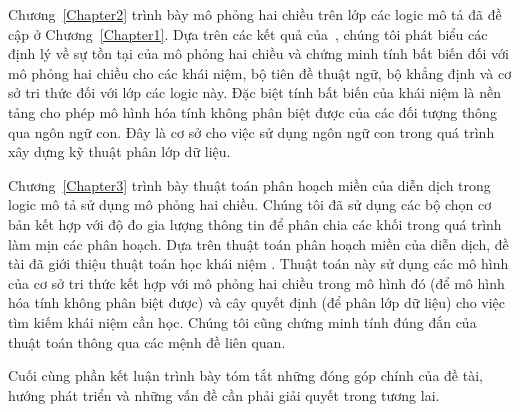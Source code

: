 Chương~\ref{Chapter2} trình bày mô phỏng hai chiều trên lớp các logic mô tả đã đề cập ở Chương~\ref{Chapter1}. Dựa trên các kết quả của~\cite{Divroodi2011B}, chúng tôi phát biểu các định lý về sự tồn tại của mô phỏng hai chiều và chứng minh tính bất biến đối với mô phỏng hai chiều cho các khái niệm, bộ tiên đề thuật ngữ, bộ khẳng định và cơ sở tri thức đối với lớp các logic này. Đặc biệt tính bất biến của khái niệm là nền tảng cho phép mô hình hóa tính không phân biệt được của các đối tượng thông qua ngôn ngữ con. Đây là cơ sở cho việc sử dụng ngôn ngữ con trong quá trình xây dựng kỹ thuật phân lớp dữ liệu.
	
Chương~\ref{Chapter3} trình bày thuật toán phân hoạch miền của diễn dịch trong logic mô tả sử dụng mô phỏng hai chiều. Chúng tôi đã sử dụng các bộ chọn cơ bản kết hợp với độ đo gia lượng thông tin để phân chia các khối trong quá trình làm mịn các phân hoạch. Dựa trên thuật toán phân hoạch miền của diễn dịch, đề tài đã giới thiệu thuật toán học khái niệm \BBCLearnS. Thuật toán này sử dụng các mô hình của cơ sở tri thức kết hợp với mô phỏng hai chiều trong mô hình đó (để mô hình hóa tính không phân biệt được) và cây quyết định (để phân lớp dữ liệu) cho việc tìm kiếm khái niệm cần học. Chúng tôi cũng chứng minh tính đúng đắn của thuật toán thông qua các mệnh đề liên quan.

Cuối cùng phần kết luận trình bày tóm tắt những đóng góp chính của đề tài, hướng phát triển và những vấn đề cần phải giải quyết trong tương lai.
\cleardoublepage